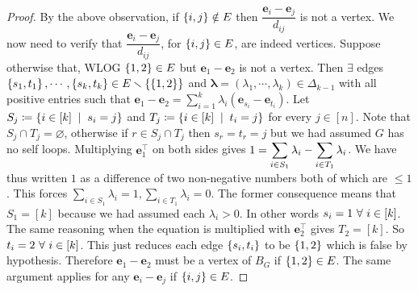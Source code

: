 \begin{proof}
By the above observation, if $\left\{i,j\right\}\notin E$ then $\dfrac{\pmb e_{i}-\pmb e_{j}}{d_{ij}}$ is not a vertex. We now need to verify that $\dfrac{\pmb e_{i}-\pmb e_{j}}{d_{ij}}$, for $\left\{i,j\right\}\in E$, are indeed vertices. Suppose otherwise that, WLOG $\left\{1,2\right\}\in E$ but $\pmb e_{1}-\pmb e_{2}$ is not a vertex. Then $\exists$ edges $\left\{s_{1},t_{1}\right\},\cdots, \left\{s_{k},t_{k}\right\}\in E\smallsetminus\left\{\left\{1,2\right\}\right\}$ and $\pmb \lambda = (\lambda_{1},\cdots,\lambda_{k})\in \Delta_{k-1}$ with all positive entries such that $\pmb e_{1}-\pmb e_{2} = \sum\limits_{i=1}^{k}\lambda_{i}(\pmb e_{s_{i}}-\pmb e_{t_{i}})$. %
Let $S_{j} \sett \set{i\in[k]\st s_{i}=j}$ and $T_{j} \sett \set{i\in[k]\st t_{i}=j}$ for every $j\in[n]$. Note that $S_{j}\cap T_{j} = \varnothing$, otherwise if $r\in S_{j}\cap T_{j}$ then $s_{r} = t_{r} = j$ but we had assumed $G$ has no self loops. Multiplying $\pmb e_{1}^{\top}$ on both sides gives $\displaystyle 1 = \sum\limits_{i\in S_{1}}\lambda_{i} - \sum\limits_{i\in T_{1}}\lambda_{i}$. We have thus written $1$ as a difference of two non-negative numbers both of which are $\le 1$. This forces $\sum\limits_{i\in S_{1}}\lambda_{i} = 1, \sum\limits_{i\in T_{1}}\lambda_{i} = 0$. The former consequence means that $S_{1}=[k]$ because we had assumed each $\lambda_{i}>0$. In other words $s_{i}=1~\forall~ i\in[k]$.  The same reasoning when the equation is multiplied with $\pmb e_{2}^{\top}$ gives $T_{2}=[k]$. So $t_{i} = 2~\forall~ i\in[k]$. This just reduces each edge $\left\{s_{i},t_{i}\right\}$ to be $\left\{1,2\right\}$ which is false by hypothesis. Therefore $\pmb e_{1}-\pmb e_{2}$ must be a vertex of $B_{G}$ if $\left\{1,2\right\}\in E$. The same argument applies for any $\pmb e_{i}-\pmb e_{j}$ if $\left\{i,j\right\}\in E$.
\end{proof}
\newpage
\printbibliography


